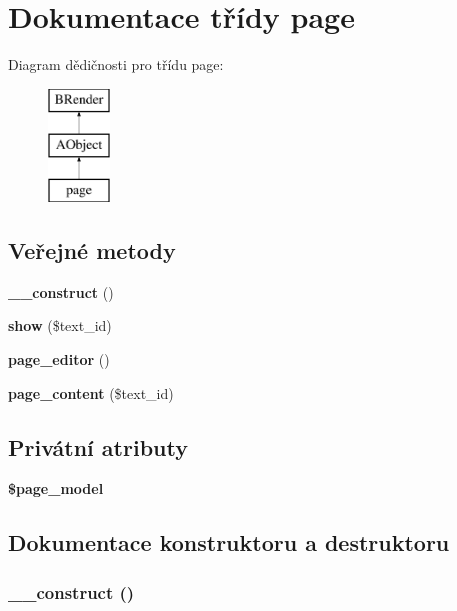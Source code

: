 \section{Dokumentace třídy page}
\label{d5/d13/classpage}
Diagram dědičnosti pro třídu page:\begin{figure}[H]
\begin{center}
\leavevmode
\includegraphics[height=3cm]{d5/d13/classpage}
\end{center}
\end{figure}
\subsection*{Veřejné metody}
\begin{DoxyCompactItemize}
\item 
{\bf \_\-\_\-construct} ()
\item 
{\bf show} (\$text\_\-id)
\item 
{\bf page\_\-editor} ()
\item 
{\bf page\_\-content} (\$text\_\-id)
\end{DoxyCompactItemize}
\subsection*{Privátní atributy}
\begin{DoxyCompactItemize}
\item 
{\bf \$page\_\-model}
\end{DoxyCompactItemize}


\subsection{Dokumentace konstruktoru a destruktoru}
\subsubsection[{\_\-\_\-construct}]{\setlength{\rightskip}{0pt plus 5cm}\_\-\_\-construct ()}\label{d5/d13/classpage_a095c5d389db211932136b53f25f39685}


